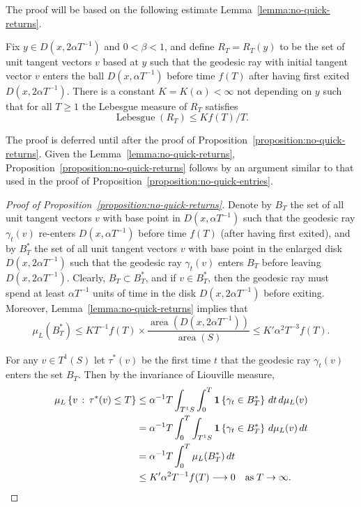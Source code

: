 \documentclass[AHL, Unicode, longabstracts, published]{cedram}
\newcommand{\xset}[1]{\left\{ #1 \right\}}
\DeclareMathOperator{\area}{area}
\DeclareMathOperator{\Lebesgue}{Lebesgue}
\begin{document}
The proof will be based on the following estimate Lemma~\ref{lemma:no-quick-returns}.

\begin{lemm}\label{lemma:no-quick-returns}
Fix $y \in D(x, 2\alpha T^{-1})$ and $0< \beta <1$, and define $R_{T}=R_{T}(y)$ to be the set of unit tangent vectors $v$ based at $y$ such that the geodesic ray with initial tangent vector $v$ enters the ball $D(x, \alpha T^{-1})$ before time $f(T)$ after having first exited $D(x, 2 \alpha T^{-1})$. There is a constant $K=K(\alpha)< \infty$ not depending on $y$ such that for all $T \geq 1$ the Lebesgue measure of $R_{T}$ satisfies
\begin{equation}\label{eq:no-quick-returns}
\Lebesgue (R_{T})\leq K f(T)/T.
\end{equation}
\end{lemm}

The proof is deferred until after the proof of Proposition~\ref{proposition:no-quick-returns}. Given the Lemma~\ref{lemma:no-quick-returns}, Proposition~\ref{proposition:no-quick-returns} follows by an argument similar to that used in the proof of Proposition~\ref{proposition:no-quick-entries}.

\begin{proof}[Proof of Proposition~\ref{proposition:no-quick-returns}]
Denote by $B_{T}$ the set of all unit tangent vectors $v$ with base point in $D(x, \alpha T^{-1})$ such that the geodesic ray $\gamma_{t}(v)$ re-enters $D(x, \alpha T^{-1})$ before time $f(T)$ (after having first exited), and by $B^{*}_{T}$ the set of all unit tangent vectors $v$ with base point in the enlarged disk $D(x, 2\alpha T^{-1})$ such that the geodesic ray $\gamma_{t}(v)$ enters $B_{T}$ before leaving $D(x, 2\alpha T^{-1})$. Clearly, $B_{T}\subset B^{*}_{T}$, and if $v \in B^{*}_{T}$, then the geodesic ray must spend at least $\alpha T^{-1}$ units of time in the disk $D(x, 2 \alpha T^{-1})$ before exiting. Moreover, Lemma~\ref{lemma:no-quick-returns} implies that
\[
\mu_{L}(B^{*}_{T})\leq K T^{-1} f(T)\times \frac{\area(D(x, 2 \alpha T^{-1}))}{\area(S)} \leq K'
\alpha^{2} T^{-3} f(T).
\]

For any $v\in T^{1}(S)$ let $\tau^{*}(v)$ be the first time $t$ that the geodesic ray $\gamma_{t}(v)$ enters the set $B_{T}$. Then by the invariance of Liouville measure,
\begin{align*}
\mu_{L}\xset {v \,:\, \tau^{*}(v)\leq T} & \leq \alpha^{-1}T
\int_{T^{1}S}\int_{0}^{T} \mathbf{1}\xset {\gamma_{t}\in B^{*}_{T}} \, dt \,d\mu_{L}(v)\\
& = \alpha^{-1}T\int_{0}^{T} \int_{T^{1}S} \mathbf{1}
\xset {\gamma_{t}\in B^{*}_{T}} \, d\mu_{L}(v) \,dt\\
&= \alpha^{-1}T \int_{0}^{T}\mu_{L}(B^{*}_{T}) \, dt \\
&\leq K' \alpha^{2} T^{-1} f(T)\longrightarrow 0 \quad \text{as} \; T \rightarrow \infty.\qedhere
\end{align*}
\end{proof}
\end{document}
